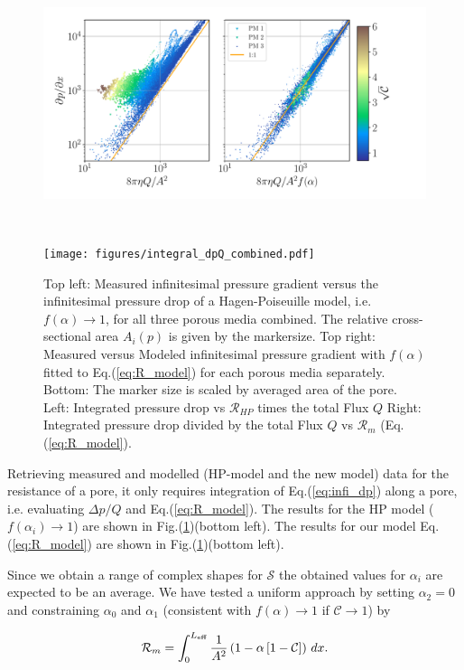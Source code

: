 \documentclass[draft]{agujournal2019}
\begin{document}
\begin{figure}
\includegraphics[height=8cm]{figures/infi_dpdx_combined.pdf}
\texttt{[image: figures/integral\_dpQ\_combined.pdf]}
\caption{Top left: Measured infinitesimal pressure gradient versus the infinitesimal pressure drop of a Hagen-Poiseuille model, i.e. $f(\alpha)\rightarrow 1$, for all three porous media combined. The relative cross-sectional area $A_i(p)$ is given by the markersize. Top right: Measured versus Modeled infinitesimal pressure gradient with $f(\alpha)$ fitted to Eq.(\ref{eq:R_model}) for each porous media separately. Bottom: The marker size is scaled by averaged area of the pore. Left: Integrated pressure drop vs $\mathcal{R}_{HP}$ times the total Flux $Q$ Right: Integrated pressure drop divided by the total Flux $Q$ vs $\mathcal{R}_m$ (Eq.(\ref{eq:R_model}). }
\label{fig:local_and_integrated}
\end{figure}


Retrieving measured and modelled (HP-model and the new model) data for the resistance of a pore, it only requires integration of Eq.(\ref{eq:infi_dp}) along a pore, i.e. evaluating $\Delta p/Q$ and Eq.(\ref{eq:R_model}). The results for the HP model ($f(\alpha_i)\rightarrow1$) are shown in Fig.(\ref{fig:local_and_integrated})(bottom left). The results for our model Eq.(\ref{eq:R_model}) are shown in Fig.(\ref{fig:local_and_integrated})(bottom left).

Since we obtain a range of complex shapes for $\mathcal{S}$ the obtained values for $\alpha_i$ are expected to be an average. We have tested a uniform approach by setting $\alpha_2 = 0$ and constraining $\alpha_0$ and $\alpha_1$ (consistent with $f(\alpha)\rightarrow 1$ if $\mathcal{C} \rightarrow 1$) by 

\begin{equation}
	\mathcal{R}_m = \int^{L_{\rm{eff}}}_{0}\frac{1}{A^2}\left(1-\alpha\left[1-\mathcal{C}\right] \right)\,dx\label{eq:R_model_uniform}.
\end{equation}
\end{document}

